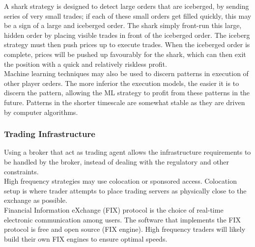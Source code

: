 A shark strategy is designed to detect large orders that are iceberged, by sending series of very small trades; if each of these small orders get filled quickly, this may be a sign of a large and iceberged order. The shark simply front-run this large, hidden order by placing visible trades in front of the iceberged order. The iceberg strategy must then push prices up to execute trades. When the iceberged order is complete, prices will be pushed up favourably for the shark, which can then exit the position with a quick and relatively riskless profit.\\

Machine learning techniques may also be used to discern patterns in execution of other player orders. The more inferior the execution models, the easier it is to discern the pattern, allowing the ML strategy to profit from these patterns in the future. Patterns in the shorter timescale are somewhat stable as they are driven by computer algorithms.

\subsubsection{Trading Infrastructure}

Using a broker that act as trading agent allows the infrastructure requirements to be handled by the broker, instead of dealing with the regulatory and other constraints. \\

High frequency strategies may use colocation or sponsored access. Colocation setup is where trader attempts to place trading servers as physically close to the exchange as possible.\\

Financial Information eXchange (FIX) protocol is the choice of real-time electronic communication among users. The software that implements the FIX protocol is free and open source (FIX engine). High frequency traders will likely build their own FIX engines to ensure optimal speeds.
